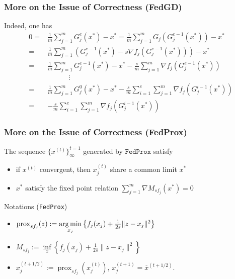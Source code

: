 
\begin{frame}
\frametitle{More on the Issue of Correctness (FedGD)}

Indeed, one has
{\smaller
\begin{align*}
0 = & \frac{1}{m}\sum_{j=1}^m G^e_j(x^{*}) - x^{*} = \frac{1}{m}\sum_{j=1}^m G_j(G^{e-1}_j(x^{*})) - x^{*} \\
= & \frac{1}{m}\sum_{j=1}^m \left( G^{e-1}_j(x^{*}) - s\nabla f_j (G^{e-1}_j(x^{*})) \right) - x^{*} \\
= & \frac{1}{m}\sum_{j=1}^m G^{e-1}_j(x^{*}) - x^{*} - \frac{s}{m}\sum_{j=1}^m\nabla f_j (G^{e-1}_j(x^{*})) \\
& \hspace{3em} \vdots \\
= & \frac{1}{m}\sum_{j=1}^m G^{0}_j(x^{*}) - x^{*} - \frac{s}{m}\sum\limits_{i=1}^e\sum\limits_{j=1}^m \nabla f_j(G_j^{i-1}(x^*)) \\
= & - \frac{s}{m}\sum\limits_{i=1}^e\sum\limits_{j=1}^m \nabla f_j(G_j^{i-1}(x^*))
\end{align*}
}

\end{frame}


\begin{frame}
\frametitle{More on the Issue of Correctness (FedProx)}

\begin{prop}
The sequence $\{x^{(t)}\}^{t=1}_{\infty}$ generated by $\texttt{FedProx}$ satisfy
\begin{itemize}
    \item if $x^{(t)}$ convergent, then $x_j^{(t)}$ share a common limit $x^*$
    \vspace{-0.3em}
    \item $x^*$ satisfy the fixed point relation {$\sum\limits_{j=1}^m \nabla M_{sf_j}(x^*) = 0$}
\end{itemize}
\end{prop}

\begin{block}{Notations (\texttt{FedProx})}
\begin{itemize}
\item $\operatorname{prox}_{sf_j} (z) := \operatorname*{arg\,min}\limits_{x_j} \left\{ f_j(x_j) + \frac{1}{2s} \lVert z-x_j \rVert^2 \right\}$
\vspace{-0.3em}
\item $M_{sf_j} := \inf\limits_x \left\{ f_j(x_j) + \frac{1}{2s} \lVert z-x_j \rVert^2 \right\}$
\vspace{-0.3em}
\item $x_j^{(t+1/2)} := \operatorname{prox}_{sf_j}(x_j^{(t)})$, $x_j^{(t+1)} = \overline{x}^{(t+1/2)}.$
\end{itemize}
\end{block}

\end{frame}

